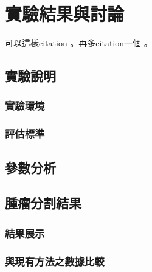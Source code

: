 
\chapter{實驗結果與討論}

可以這樣citation \cite{isensee2021nnu}。再多citation一個 \cite{IEEE-1363}。
\section{實驗說明}

\subsection{實驗環境}

\subsection{評估標準}


\section{參數分析}


\section{腫瘤分割結果}


\subsection{結果展示}

\subsection{與現有方法之數據比較}

